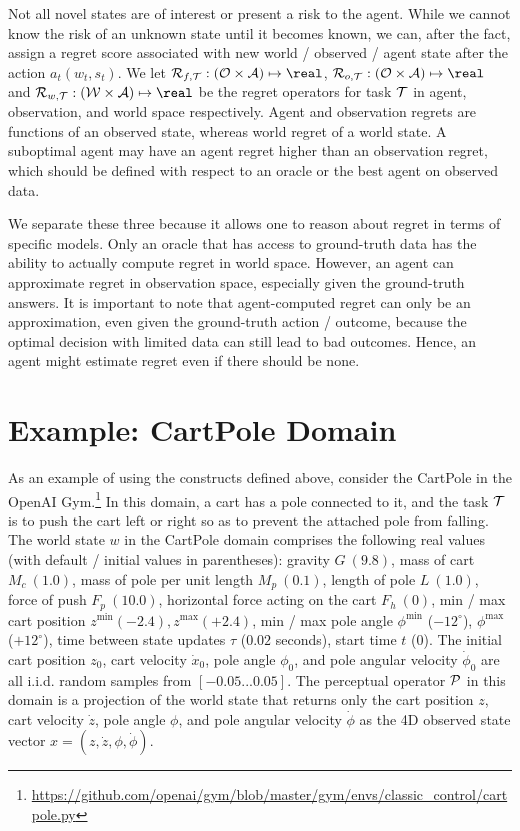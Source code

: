 Not all novel states are of interest or present a risk to the agent.
While we cannot know the risk of an unknown state until it becomes known, we can, after the fact, assign a regret score associated with new world / observed / agent state after the action $a_t(w_t,s_t)$. 
We let ${\cal R}_{f,{\cal T}}:({\cal O} \times {\cal A} )\mapsto\real$, ${\cal R}_{o,{\cal T}}:({\cal O}\times {\cal A} )\mapsto\real$ and ${\cal R}_{w,{\cal T}}:({\cal W} \times {\cal A} )\mapsto\real$ be the regret operators for task ${\cal T}$ in agent, observation, and world space respectively. Agent and observation regrets are functions of an observed state, whereas world regret of a world state. A suboptimal agent may have an agent regret higher than an observation regret, which should be defined with respect to an oracle or the best agent on observed data.   

We separate these three because it allows one to reason about regret in terms of specific models. Only an oracle that has access to ground-truth data has the ability to actually compute regret in world space. However, an agent can approximate regret in observation space, especially given the ground-truth answers. It is important to note that agent-computed regret can only be an approximation, even given the ground-truth action / outcome, because the optimal decision with limited data can still lead to bad outcomes. Hence, an agent might estimate regret even if there should be none. 




\section{Example: CartPole Domain}



As an example of using the constructs defined above, consider  the 
CartPole in the OpenAI Gym.\footnote{\url{https://github.com/openai/gym/blob/master/gym/envs/classic_control/cartpole.py}} 
In this domain, a cart has a pole connected to it, and the task ${\cal T}$ is to push the cart left or right so as to prevent the attached pole from falling. 
The world state $w$ in the CartPole domain comprises the following real values (with default / initial values in parentheses): 
gravity $G~(9.8)$, 
mass of cart $M_c~(1.0)$, 
mass of pole per unit length $M_p~(0.1)$,
length of pole $L~(1.0)$,
force of push $F_p~(10.0)$,
horizontal force acting on the cart $F_h~(0)$,
min / max cart position $z^{\text{min}} (-2.4), z^{\text{max}} (+2.4)$,
min / max pole angle $\phi^{\text{min}}$ ($-12^{\circ}$), $\phi^{\text{max}}$ ($+12^{\circ} $),
time between state updates $\tau$ ($0.02$ seconds), 
start time $t$ (0). The
initial cart position $z_0$, 
 cart velocity $\dot{x}_0$, 
 pole angle $\phi_0$, 
and  pole angular velocity $\dot{\phi}_0$ are all i.i.d. random samples from  $[-0.05...0.05]$.
The perceptual operator ${\cal P}$ in this domain is a projection of the world state that returns only the cart position $z$, cart velocity $\dot{z}$, pole angle $\phi$, and pole angular velocity $\dot{\phi}$ as the 4D observed state vector  $x=(z, \dot{z}, \phi, \dot{\phi})$. 

